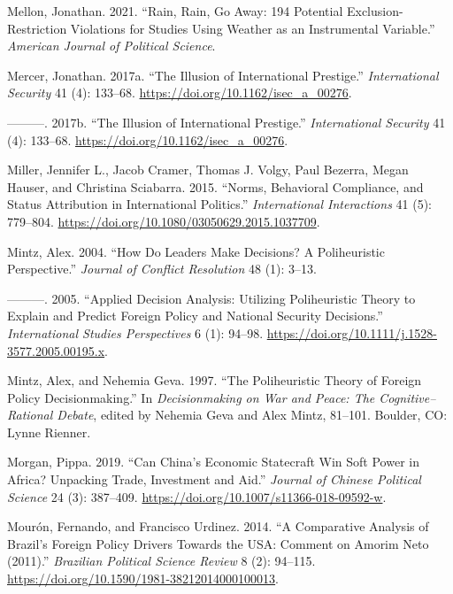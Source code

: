 \documentclass[
  12pt,
]{article}
\newlength{\cslhangindent}
\newenvironment{CSLReferences}[2] %
 {\begin{list}{}{%
  \setlength{\itemindent}{0pt}
  \setlength{\leftmargin}{0pt}
  \setlength{\parsep}{0pt}
  \ifodd #1
   \setlength{\leftmargin}{\cslhangindent}
   \setlength{\itemindent}{-1\cslhangindent}
  \fi
  \setlength{\itemsep}{#2\baselineskip}}}
 {\end{list}}
\begin{document}
\begin{CSLReferences}{1}{0}
Mellon, Jonathan. 2021. {``Rain, Rain, Go Away: 194 Potential
Exclusion-Restriction Violations for Studies Using Weather as an
Instrumental Variable.''} \emph{American Journal of Political Science}.

Mercer, Jonathan. 2017a. {``The {Illusion} of {International
Prestige}.''} \emph{International Security} 41 (4): 133--68.
\url{https://doi.org/10.1162/isec_a_00276}.

---------. 2017b. {``The {Illusion} of {International Prestige}.''}
\emph{International Security} 41 (4): 133--68.
\url{https://doi.org/10.1162/isec_a_00276}.

Miller, Jennifer L., Jacob Cramer, Thomas J. Volgy, Paul Bezerra, Megan
Hauser, and Christina Sciabarra. 2015. {``Norms, {Behavioral
Compliance}, and {Status Attribution} in {International Politics}.''}
\emph{International Interactions} 41 (5): 779--804.
\url{https://doi.org/10.1080/03050629.2015.1037709}.

Mintz, Alex. 2004. {``How Do Leaders Make Decisions? {A} Poliheuristic
Perspective.''} \emph{Journal of Conflict Resolution} 48 (1): 3--13.

---------. 2005. {``Applied {Decision Analysis}: {Utilizing
Poliheuristic Theory} to {Explain} and {Predict Foreign Policy} and
{National Security Decisions}.''} \emph{International Studies
Perspectives} 6 (1): 94--98.
\url{https://doi.org/10.1111/j.1528-3577.2005.00195.x}.

Mintz, Alex, and Nehemia Geva. 1997. {``The Poliheuristic Theory of
Foreign Policy Decisionmaking.''} In \emph{Decisionmaking on War and
Peace: {The} Cognitive--Rational Debate}, edited by Nehemia Geva and
Alex Mintz, 81--101. Boulder, CO: Lynne Rienner.

Morgan, Pippa. 2019. {``Can {China}'s {Economic Statecraft Win Soft
Power} in {Africa}? {Unpacking Trade}, {Investment} and {Aid}.''}
\emph{Journal of Chinese Political Science} 24 (3): 387--409.
\url{https://doi.org/10.1007/s11366-018-09592-w}.

Mourón, Fernando, and Francisco Urdinez. 2014. {``A {Comparative
Analysis} of {Brazil}'s {Foreign Policy Drivers Towards} the {USA}:
{Comment} on {Amorim Neto} (2011).''} \emph{Brazilian Political Science
Review} 8 (2): 94--115.
\url{https://doi.org/10.1590/1981-38212014000100013}.


\end{CSLReferences}
\end{document}
